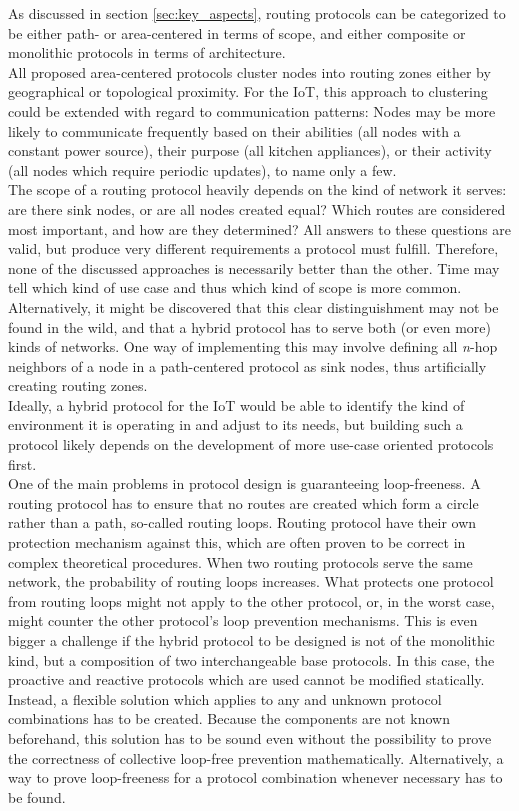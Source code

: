 \documentclass[a4paper,10pt]{scrartcl}
\begin{document}
As discussed in section \ref{sec:key_aspects}, routing protocols can be categorized to be either path- or area-centered in terms of scope, and either composite or monolithic protocols in terms of architecture.\\ %
All proposed area-centered protocols cluster nodes into routing zones either by geographical or topological proximity. For the IoT, this approach to clustering could be extended with regard to communication patterns: Nodes may be more likely to communicate frequently based on their abilities (all nodes with a constant power source), their purpose (all kitchen appliances), or their activity (all nodes which require periodic updates), to name only a few.\\
The scope of a routing protocol heavily depends on the kind of network it serves: are there sink nodes, or are all nodes created equal? Which routes are considered most important, and how are they determined? All answers to these questions are valid, but produce very different requirements a protocol must fulfill.
Therefore, none of the discussed approaches is necessarily better than the other. Time may tell which kind of use case and thus which kind of scope is more common. Alternatively, it might be discovered that this clear distinguishment may not be found in the wild, and that a hybrid protocol has to serve both (or even more) kinds of networks. One way of implementing this may involve defining all \emph{n}-hop neighbors of a node in a path-centered protocol as sink nodes, thus artificially creating routing zones.\\
Ideally, a hybrid protocol for the IoT would be able to identify the kind of environment it is operating in and adjust to its needs, but building such a protocol likely depends on the development of more use-case oriented protocols first.\\

One of the main problems in protocol design is guaranteeing loop-freeness. A routing protocol has to ensure that no routes are created which form a circle rather than a path, so-called routing loops. Routing protocol have their own protection mechanism against this, which are often proven to be correct in complex theoretical procedures. When two routing protocols serve the same network, the probability of routing loops increases. What protects one protocol from routing loops might not apply to the other protocol, or, in the worst case, might counter the other protocol's loop prevention mechanisms. This is even bigger a challenge if the hybrid protocol to be designed is not of the monolithic kind, but a composition of two interchangeable base protocols. In this case, the proactive and reactive protocols which are used cannot be modified statically. Instead, a flexible solution which applies to any and unknown protocol combinations has to be created. Because the components are not known beforehand, this solution has to be sound even without the possibility to prove the correctness of collective loop-free prevention mathematically. Alternatively, a way to prove loop-freeness for a protocol combination whenever necessary has to be found.\\
\end{document}
